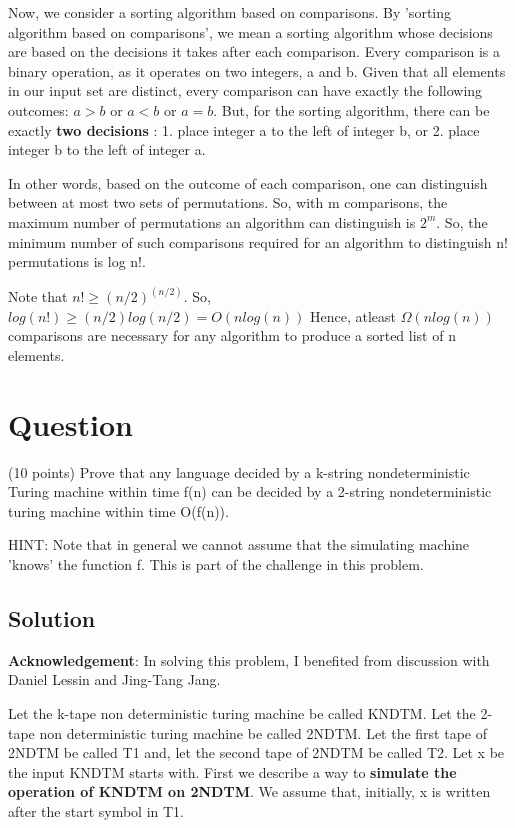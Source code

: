 \documentclass[10pt]{article}
\begin{document}
Now, we consider a sorting algorithm based on comparisons. By 'sorting algorithm based on comparisons', we mean a sorting algorithm whose decisions are based on the decisions it takes after each comparison. Every comparison is a binary operation, as it operates on two integers, a and b. Given that all elements in our input set are distinct, every comparison can have exactly the following outcomes: $a>b$ or $a<b$ or $a=b$. But, for the sorting algorithm, there can be exactly \textbf{two decisions} : 1. place integer a to the left of integer b, or 2. place integer b to the left of integer a. 

In other words, based on the outcome of each comparison, one can distinguish between at most two sets of permutations. So, with m comparisons, the maximum number of permutations an algorithm can distinguish is $2^{m}$. So, the minimum number of such comparisons required for an algorithm to distinguish n! permutations is log n!.

Note that $n! \geq (n/2)^{(n/2)}$. So, $log (n!) \geq (n/2)log(n/2) = O(n log (n))$ Hence, atleast $\Omega(n log (n))$ comparisons are necessary for any algorithm to produce a sorted list of n elements.

\section{Question}

(10 points) Prove that any language decided by a k-string nondeterministic Turing machine within time f(n) can be decided by a 2-string nondeterministic turing machine within time O(f(n)).

HINT: Note that in general we cannot assume that the simulating machine 'knows' the function f. This is part of the challenge in this problem.

\subsection{Solution}

\textbf{Acknowledgement}: In solving this problem, I benefited from discussion with Daniel Lessin and Jing-Tang Jang.

Let the k-tape non deterministic turing machine be called KNDTM. Let the 2-tape non deterministic turing machine be called 2NDTM. Let the first tape of 2NDTM be called T1 and, let the second tape of 2NDTM be called T2. Let x be the input KNDTM starts with. First we describe a way to \textbf{simulate the operation of KNDTM on 2NDTM}. We assume that, initially, x is written after the start symbol in T1.
\end{document}

